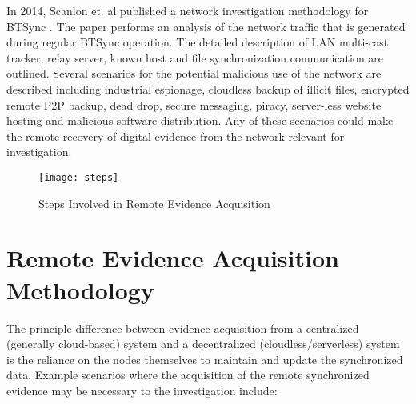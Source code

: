 \documentclass{jdfsl}
\begin{document}
In 2014, Scanlon et. al published a network investigation methodology for BTSync \cite{scanlon2014methodology}. The paper performs an analysis of the network traffic that is generated during regular BTSync operation. The detailed description of LAN multi-cast, tracker, relay server, known host and file synchronization communication are outlined. Several scenarios for the potential malicious use of the network are described including industrial espionage, cloudless backup of illicit files, encrypted remote P2P backup, dead drop, secure messaging, piracy, server-less website hosting and malicious software distribution. Any of these scenarios could make the remote recovery of digital evidence from the network relevant for investigation.\\

\begin{figure*}[!t]
\centering
\texttt{[image: steps]}
\caption{Steps Involved in Remote Evidence Acquisition}
\label{fig:steps}
\end{figure*}







\section{Remote Evidence Acquisition Methodology}
The principle difference between evidence acquisition from a centralized (generally cloud-based) system and a decentralized (cloudless/serverless) system is the reliance on the nodes themselves to maintain and update the synchronized data.
Example scenarios where the acquisition of the remote synchronized evidence may be necessary to the investigation include:
\end{document}
